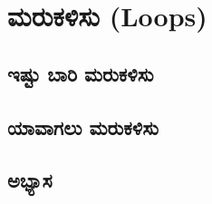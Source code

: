 \chapter{ಮರುಕಳಿಸು (\textenglish{Loops})}
\SampleProgram

\section{ಇಷ್ಟು ಬಾರಿ ಮರುಕಳಿಸು }
\section{ಯಾವಾಗಲು ಮರುಕಳಿಸು }
\section{ಅಭ್ಯಾಸ }
